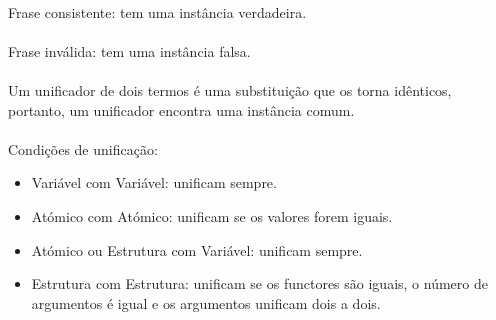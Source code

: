 \documentclass[../resumosPLOG.tex]{subfiles}
\begin{document}
\paragraph{}

Frase consistente: tem uma instância verdadeira.

\paragraph{}

Frase inválida: tem uma instância falsa.

\paragraph{}

Um unificador de dois termos é uma substituição que os torna idênticos, portanto, um unificador encontra uma instância comum.

\paragraph{}

Condições de unificação:
\begin{itemize}
    \item Variável com Variável: unificam sempre.
    \item Atómico com Atómico: unificam se os valores forem iguais.
    \item Atómico ou Estrutura com Variável: unificam sempre.
    \item Estrutura com Estrutura: unificam se os functores são iguais, o número de argumentos é igual e os argumentos unificam dois a dois.
\end{itemize}

\paragraph{}
\end{document}
